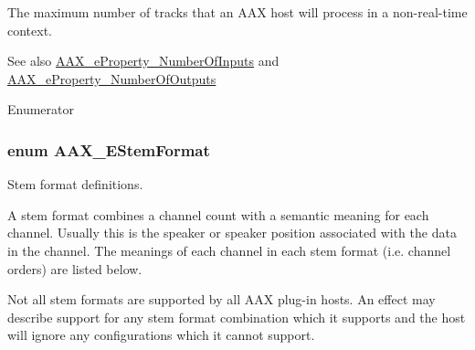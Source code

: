 The maximum number of tracks that an A\+A\+X host will process in a non-\/real-\/time context. 

\begin{DoxySeeAlso}{See also}
\hyperlink{a00283_a6571f4e41a5dd06e4067249228e2249ea00ed3da39077c52ef259f350837fc981}{A\+A\+X\+\_\+e\+Property\+\_\+\+Number\+Of\+Inputs} and \hyperlink{a00283_a6571f4e41a5dd06e4067249228e2249eab7e07d482d3b6e527fc13bbc9f4eaf63}{A\+A\+X\+\_\+e\+Property\+\_\+\+Number\+Of\+Outputs} 
\end{DoxySeeAlso}
\begin{Desc}
\item[Enumerator]\par
\begin{description}
\item[{\em 
\hypertarget{a00206_af94bcc724bc9a54eb8a83a664c0b1b48ae17d0cdef833dd0574d2e6b155ef2f86}{}A\+A\+X\+\_\+e\+Max\+Audio\+Suite\+Tracks\label{a00206_af94bcc724bc9a54eb8a83a664c0b1b48ae17d0cdef833dd0574d2e6b155ef2f86}
}]\end{description}
\end{Desc}
\hypertarget{a00206_ad8af5ef008b2bd478add9a0acb0a1d85}{}
\subsubsection[{A\+A\+X\+\_\+\+E\+Stem\+Format}]{\setlength{\rightskip}{0pt plus 5cm}enum {\bf A\+A\+X\+\_\+\+E\+Stem\+Format}}\label{a00206_ad8af5ef008b2bd478add9a0acb0a1d85}


Stem format definitions. 

A stem format combines a channel count with a semantic meaning for each channel. Usually this is the speaker or speaker position associated with the data in the channel. The meanings of each channel in each stem format (i.\+e. channel orders) are listed below.

Not all stem formats are supported by all A\+A\+X plug-\/in hosts. An effect may describe support for any stem format combination which it supports and the host will ignore any configurations which it cannot support.

